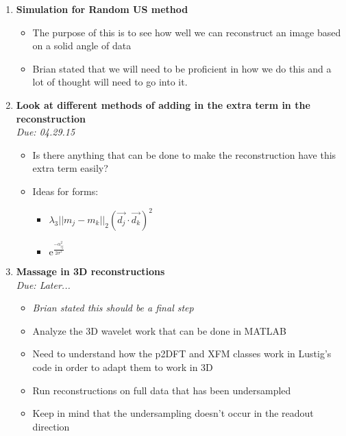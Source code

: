 \documentclass[11 pt]{article}
\newcommand{\me}{\mathrm{e}}
\newcommand{\bo}{\noindent\textbf}
\begin{document}
\begin{enumerate}
      \item \bo{Simulation for Random US method}
	    \begin{itemize}
		  \item The purpose of this is to see how well we can reconstruct an image based on a solid angle of data
		  \item Brian stated that we will need to be proficient in how we do this and a lot of thought will need to go into it.
	    \end{itemize}
      
      
       \item \bo{Look at different methods of adding in the extra term in the reconstruction}\\
	    \emph{Due: 04.29.15}
	    \begin{itemize}
		  \item Is there anything that can be done to make the reconstruction have this extra term easily?
		  \item Ideas for forms:
		  \begin{itemize}
		      \item $\lambda_3 ||m_j - m_k||_2 (\vec{d_j} \cdot \vec{d_k})^2$
		      \item $\me^{\frac{-\alpha_{ij}^2}{2\sigma^2}}$
		  \end{itemize}
	    \end{itemize}
      
      \item \bo{Massage in 3D reconstructions}\\
	    \emph{Due: Later...}
	    \begin{itemize}
		  \item \emph{Brian stated this should be a final step}
		  \item Analyze the 3D wavelet work that can be done in MATLAB
		  \item Need to understand how the p2DFT and XFM classes work in Lustig's code in order to adapt them to work in 3D
		  \item Run reconstructions on full data that has been undersampled
		  \item Keep in mind that the undersampling doesn't occur in the readout direction
	    \end{itemize}

      


\end{enumerate}
\end{document}
